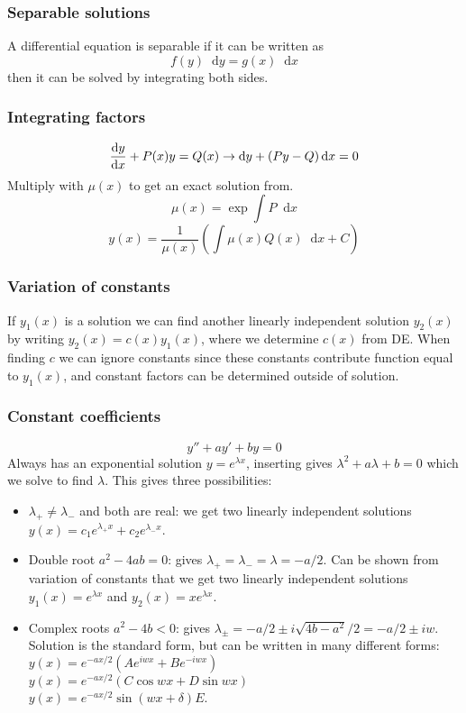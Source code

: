 \documentclass[a4paper, 10pt]{article}
\newcommand*\diff{\mathop{}\!\mathrm{d}}
\begin{document}
\begin{multicols*}{3}
\subsubsection*{\small Separable solutions}
A differential equation is separable if it can be written as $$f(y) \diff y = g(x) \diff x$$
then it can be solved by integrating both sides.

\subsubsection*{\small Integrating factors}
$$\dv{y}{x} + P(x)y = Q(x) \rightarrow \diff y + \left(Py-Q\right)\diff x = 0$$
Multiply with $\mu(x)$ to get an exact solution from.
$$ \mu(x) = \exp{\int P \diff x}$$
$$ y(x) = \frac{1}{\mu(x)}\left( \int \mu(x)Q(x)\diff x +C\right)$$
\subsubsection*{\small Variation of constants}
If $y_1(x)$ is a solution we can find another linearly independent solution $y_2(x)$ by writing $y_2(x) = c(x)y_1(x)$, where we determine $c(x)$ from DE. When finding $c$ we can ignore constants since these constants contribute function equal to $y_1(x)$, and constant factors can be determined outside of solution.
\subsubsection*{\small Constant coefficients}
$$ y'' + ay' + by = 0$$
Always has an exponential solution $y=e^{\lambda x}$, inserting gives $\lambda^2 + a\lambda + b = 0$ which we solve to find $\lambda$. This gives three possibilities:
\begin{itemize}
  \item $\lambda_+ \neq \lambda_-$ and both are real: we get two linearly independent solutions $y(x) = c_1e^{\lambda_+x} + c_2e^{\lambda_-x}$.
  \item Double root $a^2-4ab=0$: gives $\lambda_+ = \lambda_- = \lambda = -a/2$. Can be shown from variation of constants that we get two linearly independent solutions $y_1(x) = e^{\lambda x}$ and $y_2(x) = xe^{\lambda x}$.
  \item Complex roots $a^2-4b<0$: gives $\lambda_{\pm} = -a/2 \pm i\sqrt{4b-a^2}/2 = -a/2 \pm iw$. Solution is the standard form, but can be written in many different forms: $y(x) = e^{-ax/2}\left(Ae^{iwx} + Be^{-iwx}\right)$\\
  $y(x) = e^{-ax/2}\left( C\cos{wx} + D\sin{wx} \right)$\\
  $y(x) = e^{-ax/2}\sin{(wx+\delta)}E$.
\end{itemize}


\end{multicols*}
\end{document}
